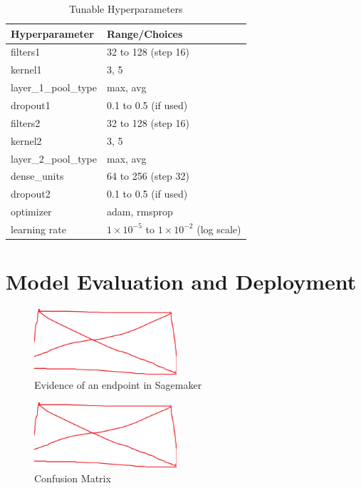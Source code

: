 \begin{table}[h]
\centering
\caption{Tunable Hyperparameters}
\begin{tabular}{ll}
\toprule
\textbf{Hyperparameter} & \textbf{Range/Choices} \\
\midrule
filters1         & 32 to 128 (step 16) \\
kernel1          & 3, 5 \\
layer\_1\_pool\_type & max, avg \\
dropout1         & 0.1 to 0.5 (if used) \\
filters2         & 32 to 128 (step 16) \\
kernel2          & 3, 5 \\
layer\_2\_pool\_type & max, avg \\
dense\_units     & 64 to 256 (step 32) \\
dropout2         & 0.1 to 0.5 (if used) \\
optimizer        & adam, rmsprop \\
learning rate    & $1\times10^{-5}$ to $1\times10^{-2}$ (log scale) \\
\bottomrule
\end{tabular}
\end{table}


\section{Model Evaluation and Deployment}


\begin{figure}[h]
    \centering
    \includegraphics[width=200px]{figures/placeholder.png} %
    \centering
    \caption{Evidence of an endpoint in Sagemaker} %
    \label{fig:endpoint} %
\end{figure}

\begin{figure}[h]
    \centering
    \includegraphics[width=200px]{figures/placeholder.png} %
    \centering
    \caption{Confusion Matrix} %
    \label{fig:confusion_matrix} %
\end{figure}



